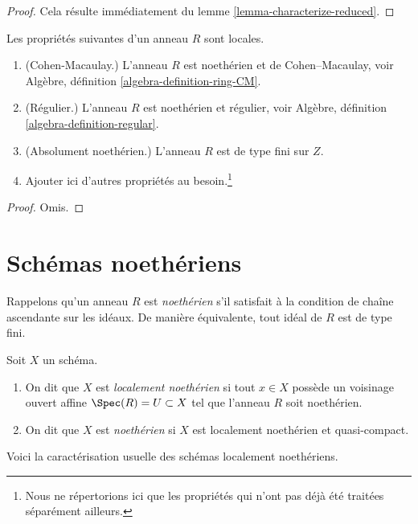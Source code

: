 \begin{proof}
Cela résulte immédiatement du lemme \ref{lemma-characterize-reduced}.
\end{proof}

\begin{lemma}
\label{lemma-properties-local}
Les propriétés suivantes d'un anneau $R$ sont locales.
\begin{enumerate}
\item (Cohen-Macaulay.)
L'anneau $R$ est noethérien et de Cohen--Macaulay, voir
Algèbre, définition \ref{algebra-definition-ring-CM}.
\item (Régulier.)
L'anneau $R$ est noethérien et régulier, voir
Algèbre, définition \ref{algebra-definition-regular}.
\item (Absolument noethérien.)
L'anneau $R$ est de type fini sur $Z$.
\item Ajouter ici d'autres propriétés au besoin.\footnote{Nous ne répertorions ici que les propriétés
qui n'ont pas déjà été traitées séparément ailleurs.}
\end{enumerate}
\end{lemma}

\begin{proof}
Omis.
\end{proof}

\section{Schémas noethériens}
\label{section-noetherian}

\noindent
Rappelons qu'un anneau $R$ est {\it noethérien} s'il satisfait à la condition
de chaîne ascendante sur les idéaux. De manière équivalente, tout idéal de $R$ est de type
fini.

\begin{definition}
\label{definition-noetherian}
Soit $X$ un schéma.
\begin{enumerate}
\item On dit que $X$ est {\it localement noethérien} si tout
$x \in X$ possède un voisinage ouvert affine
$\Spec(R) = U \subset X$ tel que l'anneau $R$ soit noethérien.
\item On dit que $X$ est {\it noethérien} si $X$ est localement noethérien
et quasi-compact.
\end{enumerate}
\end{definition}

\noindent
Voici la caractérisation usuelle des schémas localement noethériens.

